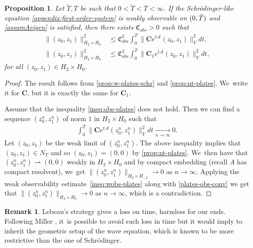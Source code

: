 \documentclass[10pt]{amsart}
\newtheorem{proposition}[theorem]{Proposition}
\theoremstyle{definition}
\newtheorem{remark}[theorem]{Remark}
\let\mc\mathcal
\let\wto\rightharpoonup
\newcommand{\A}{\mc{A}}
\newcommand{\bC}{\boldsymbol{C}}
\providecommand{\norm}[1]{\lVert#1\rVert}
\begin{document}
\begin{proposition}\label{prop:obs-schr-plates}
Let $\widetilde{T},T$ be such that $0 < \widetilde{T} < T < \infty$. If the Schrödinger-like equation
\eqref{appendix:first-order-system} is weakly observable on $(0, \Tilde{T})$ and \cref{assumAeigen} is satisfied, then there exists $\mathfrak{C}_{obs}>0$ such that
\begin{align}\label{ineq:obs-plates}
\norm{(z_0, z_1)}_{H_2\times H_0}^2&\leq \mathfrak{C}_{obs}^2\int_0^T \norm{\bC e^{t\A}(z_0, z_1)}_{Y}^2dt,\\
\label{ineq:obs-platesC1} \norm{(z_0, z_1)}_{H_2\times H_0}^2&\leq \mathfrak{C}_{obs}^2\int_0^T \norm{\bC_1 e^{t\A}(z_0, z_1)}_{Y}^2dt,
\end{align}
for all $(z_0, z_1)\in H_2\times H_0$.
\end{proposition}
\begin{proof}
The result follows from \cref{prop:w-plates-schr} and \cref{prop:nt-plates}. We~write it for $\bC$, but it is exactly the same for $\bC_1$.

Assume that the inequality \eqref{ineq:obs-plates} does not hold. Then we can find a sequence $(z_0^n, z_1^n)$ of norm $1$ in $H_2\times H_0$ such that
\begin{align}\label{plates-obs-conv}
\int_0^T \norm{\bC e^{t\A}(z_0^n, z_1^n)}_{Y}^2 dt\xrightarrow[n\to\infty]{} 0.
\end{align}
Let $(z_0, z_1)$ be the weak limit of $(z_0^n, z_1^n)$. The above inequality implies that $(z_0, z_1)\in N_T$ and so $(z_0, z_1)=(0, 0)$ by \cref{prop:nt-plates}. We~then have that $(z_0^n, z_1^n)\wto (0, 0)$ weakly in $H_2\times H_0$ and by compact embedding (recall $A$ has compact resolvent), we~get $\norm{(z_0^n, z_1^n)}_{H_0\times H_{-2}}\to 0$ as $n\to \infty$. Applying the weak observability estimate~\eqref{ineq:wobs-plates} along with \eqref{plates-obs-conv} we get that $\norm{(z_0^n, z_1^n)}_{H_2\times H_0}\to 0$ as $n\to \infty$, which is a contradiction.
\end{proof}

\begin{remark}
Lebeau's strategy gives a loss on time, harmless for our ends. Following Miller \cite{2012:miller:resolvent-control}, it~is possible to avoid such loss in time but it would imply to inherit the geometric setup of the wave equation, which is known to be more restrictive than the one of Schrödinger.
\end{remark}
\end{document}
